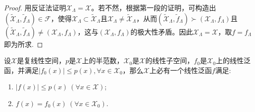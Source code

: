 \documentclass[../../main.tex]{subfiles}%
\begin{document}
\begin{proof}
用反证法证明$\mathscr{X}_\Lambda = \mathscr{X}$。若不然，根据第一段的证明，可构造出$(\widetilde{\mathscr{X}}_\Lambda, \widetilde{f}_\Lambda) \in \mathscr{F}$，使得$\mathscr{X}_\Lambda \subset \widetilde{\mathscr{X}}_\Lambda$且$\mathscr{X}_\Lambda \neq \widetilde{\mathscr{X}}_\Lambda$，从而$(\widetilde{\mathscr{X}}_\Lambda, \widetilde{f}_\Lambda) \succ (\mathscr{X}_\Lambda, f_\Lambda)$且$(\widetilde{\mathscr{X}}_\Lambda, \widetilde{f}_\Lambda) \neq (\mathscr{X}_\Lambda, f_\Lambda)$，这与$(\mathscr{X}_\Lambda, f_\Lambda)$的极大性矛盾。因此$\mathscr{X}_\Lambda = \mathscr{X}$，取$f = f_\Lambda$即为所求.
\end{proof}

\begin{theorem}\label{theorem:泛函分析--复Hahn-Banach定理}
设$\mathscr{X}$是复线性空间，$p$是$\mathscr{X}$上的半范数，$\mathscr{X}_0$是$\mathscr{X}$的线性子空间，$f_0$是$\mathscr{X}_0$上的线性泛函，并满足$|f_0(x)| \leqslant p(x), \forall x \in \mathscr{X}_0$，那么$\mathscr{X}$上必有一个线性泛函$f$满足:
\begin{enumerate}[(1)]
\item $|f(x)| \leqslant p(x) \ (\forall x \in \mathscr{X})$;
\item $f(x) = f_0(x) \ (\forall x \in \mathscr{X}_0)$.
\end{enumerate}
\end{theorem}
\end{document}
